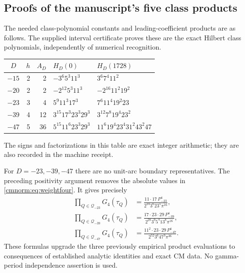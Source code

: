 \subsection{Proofs of the manuscript's five class products}

The needed class-polynomial constants and leading-coefficient products
are as follows. The supplied interval certificate proves these are the
exact Hilbert class polynomials, independently of numerical recognition.
\begin{center}
\begin{tabular}{c r r l l}
\toprule
$D$&$h$&$A_D$&$H_D(0)$&$H_D(1728)$\\
\midrule
$-15$&2&2&$-3^6 5^3 11^3$&$3^6 7^4 11^2$\\
$-20$&2&2&$-2^{12}5^3 11^3$&$-2^{16}11^2 19^2$\\
$-23$&3&4&$5^9 11^3 17^3$&$7^6 11^4 19^2 23$\\
$-39$&4&12&$3^{15}17^3 23^3 29^3$&$3^{12}7^8 19^4 23^2$\\
$-47$&5&36&$5^{15}11^6 23^3 29^3$&$11^6 19^4 23^4 31^2 43^2 47$\\
\bottomrule
\end{tabular}
\end{center}
The signs and factorizations in this table are exact integer arithmetic;
they are also recorded in the machine receipt.

For $D=-23,-39,-47$ there are no unit-arc boundary representatives.
The preceding positivity argument removes the absolute values in
\eqref{cmnorm:eq:weightfour}. It gives precisely
\begin{align}
 \prod_{Q\in\mathcal Q_{-23}}G_4(\tau_Q)
 &=\frac{11\cdot17\,P_{-23}^4}
        {2^{24}3^6 23^5\pi^{16}},\label{cmnorm:eq:G4d23}\\
 \prod_{Q\in\mathcal Q_{-39}}G_4(\tau_Q)
 &=\frac{17\cdot23\cdot29\,P_{-39}^4}
        {2^{28}3^9 5^4 13^8\pi^{16}},\label{cmnorm:eq:G4d39}\\
 \prod_{Q\in\mathcal Q_{-47}}G_4(\tau_Q)
 &=\frac{11^2\cdot23\cdot29\,P_{-47}^4}
        {2^{52}3^6 47^9\pi^{36}}.\label{cmnorm:eq:G4d47}
\end{align}
These formulas upgrade the three previously empirical product evaluations
to consequences of established analytic identities and exact CM data.
No gamma-period independence assertion is used.


